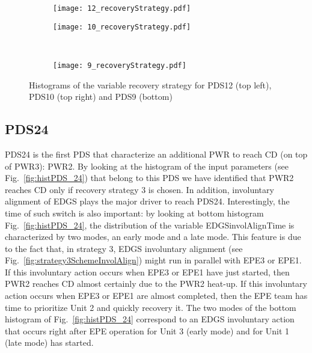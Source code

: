 \begin{figure}
  \begin{subfigure}{.5\linewidth}
    \centering
    \texttt{[image: 12\_recoveryStrategy.pdf]}
  \end{subfigure}%
  \begin{subfigure}{.5\linewidth}
    \centering
    \texttt{[image: 10\_recoveryStrategy.pdf]}
  \end{subfigure}\\[1ex]
  \begin{subfigure}{\linewidth}
    \centering
    \texttt{[image: 9\_recoveryStrategy.pdf]}
  \end{subfigure}
  \caption{Histograms of the variable recovery strategy for PDS12 (top left), PDS10 (top right) and PDS9 (bottom)}
  \label{fig:histPDS_12_10_9_recoveryStrategy}
\end{figure}

\subsection{PDS24}
PDS24 is the first PDS that characterize an additional PWR to reach CD (on top of PWR3): PWR2. By looking at the
histogram of the input parameters (see Fig.~\ref{fig:histPDS_24}) that belong to this PDS we have identified 
that PWR2 reaches CD only if recovery strategy 3 is chosen. 
In addition, involuntary alignment of EDGS plays the major driver to reach PDS24. Interestingly, the time of such 
switch is also important: by looking at bottom histogram Fig.~\ref{fig:histPDS_24}, the distribution of the 
variable EDGSinvolAlignTime is characterized by two modes, an early mode and a late mode.
This feature is due to the fact that, in strategy 3, EDGS involuntary alignment 
(see Fig.~\ref{fig:strategy3SchemeInvolAlign}) might run in parallel with EPE3 or EPE1.
If this involuntary action occurs when EPE3 or EPE1 have just started, then PWR2 reaches CD almost certainly due to
the PWR2 heat-up. If this involuntary action occurs when EPE3 or EPE1 are almost completed, then the EPE team
has time to prioritize Unit 2 and quickly recovery it.
The two modes of the bottom histogram of Fig.~\ref{fig:histPDS_24} correspond to an EDGS 
involuntary action that occurs right after EPE operation for Unit 3 (early mode) and for Unit 1 (late mode) has 
started.

